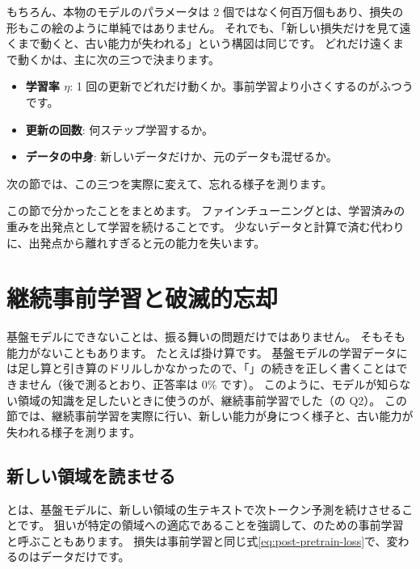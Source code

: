 もちろん、本物のモデルのパラメータは 2 個ではなく何百万個もあり、損失の形もこの絵のように単純ではありません。
それでも、「新しい損失だけを見て遠くまで動くと、古い能力が失われる」という構図は同じです。
どれだけ遠くまで動くかは、主に次の三つで決まります。

\begin{itemize}
\item \textbf{学習率 $\eta$}: 1 回の更新でどれだけ動くか。事前学習より小さくするのがふつうです。
\item \textbf{更新の回数}: 何ステップ学習するか。
\item \textbf{データの中身}: 新しいデータだけか、元のデータも混ぜるか。
\end{itemize}

次の節では、この三つを実際に変えて、忘れる様子を測ります。

この節で分かったことをまとめます。
ファインチューニングとは、学習済みの重みを出発点として学習を続けることです。
少ないデータと計算で済む代わりに、出発点から離れすぎると元の能力を失います。

\section{継続事前学習と破滅的忘却}\label{sec:post-cpt}

基盤モデルにできないことは、振る舞いの問題だけではありません。
そもそも能力がないこともあります。
たとえば掛け算です。
基盤モデルの学習データには足し算と引き算のドリルしかなかったので、「」の続きを正しく書くことはできません（後で測るとおり、正答率は 0\% です）。
このように、モデルが知らない領域の知識を足したいときに使うのが、継続事前学習でした（の Q2）。
この節では、継続事前学習を実際に行い、新しい能力が身につく様子と、古い能力が失われる様子を測ります。

\subsection{新しい領域を読ませる}

とは、基盤モデルに、新しい領域の生テキストで次トークン予測を続けさせることです。
狙いが特定の領域への適応であることを強調して、のための事前学習と呼ぶこともあります\cite{gururangan2020dont}。
損失は事前学習と同じ式\eqref{eq:post-pretrain-loss}で、変わるのはデータだけです。

